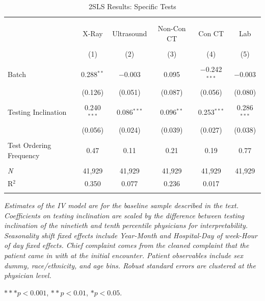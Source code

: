 \documentclass[,,nonblindrev]{informs}
\begin{document}
\begin{table}[!htbp] \centering 
  \caption{2SLS Results: Specific Tests} 
  \label{tab:2SLStests} 
\begin{tabular}{@{\extracolsep{5pt}}lccccc} 
\\[-1.8ex]\hline 
\hline \\[-1.8ex] 
\\[-1.8ex] & X-Ray & Ultrasound & Non-Con CT & Con CT & Lab \\ 
\\[-1.8ex] & (1) & (2) & (3) & (4) & (5)\\ 
\hline \\[-1.8ex] 
 Batch & 0.288$^{**}$ & $-$0.003 & 0.095 & $-$0.242$^{***}$ & $-$0.003 \\ 
  & (0.126) & (0.051) & (0.087) & (0.056)  & (0.080) \\ 
  & & & & &\\ 
 Testing Inclination & 0.240$^{***}$ & 0.086$^{***}$ & 0.096$^{**}$ & 0.253$^{***}$ & 0.286$^{***}$ \\ 
  & (0.056) & (0.024) & (0.039) & (0.027) & (0.038) \\ 
  & & & & & \\ 
Test Ordering Frequency & 0.47 & 0.11 & 0.21 & 0.19 & 0.77 \\ 
  & & & & &\\ 
\textit{N} & 41,929 & 41,929 & 41,929 & 41,929 & 41,929 \\ 
R$^{2}$ & 0.350 & 0.077 & 0.236 & 0.017 \\ 
\hline 
\hline \\[-1.8ex] 
\end{tabular}
\begin{tablenotes}
\small
\item \textit{Estimates of the IV model are for the baseline sample described in the text. Coefficients on testing inclination are scaled by the difference between testing inclination of the ninetieth and tenth percentile physicians for interpretability. Seasonality shift fixed effects include Year-Month and Hospital-Day of week-Hour of day fixed effects. Chief complaint comes from the cleaned complaint that the patient came in with at the initial encounter. Patient observables include sex dummy, race/ethnicity, and age bins. Robust standard errors are clustered at the physician level.}
\item $*** p < 0.001$, $** p < 0.01$, $* p < 0.05$.
\end{tablenotes}
\end{table}
\end{document}
